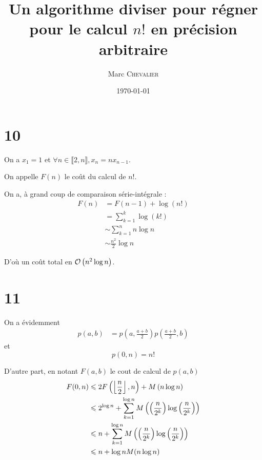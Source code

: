 

\title{Un algorithme diviser pour régner pour le calcul \texorpdfstring{$n!$}{n!} en précision arbitraire}
\author{
    Marc \textsc{Chevalier}
}
\date{\today}


\maketitle

\section*{10}

On a $x_1 = 1$ et $\forall n\in \llbracket 2,n\rrbracket, x_n = n x_{n-1}$.

On appelle $F(n)$ le coût du calcul de $n!$.

On a, à grand coup de comparaison série-intégrale :
\[
    \begin{aligned}
        F(n) &= F(n-1) + \log(n!)\\
        &= \sum\limits_{k=1}^k \log(k!)\\
        &\sim \sum\limits_{k=1}^n n \log n\\
        &\sim \frac{n^2}{2}\log n
    \end{aligned}
\]

D'où un coût total en $\mathcal O \left( n^2\log n \right)$.

\section*{11}

On a évidemment
\[
    \begin{aligned}
        p(a, b) &= p\left(a, \frac{a+b}{2}\right)p\left(\frac{a+b}{2}, b\right)
    \end{aligned}
\]
et
\[
    p(0,n) = n!
\]

D'autre part, en notant $F(a, b)$ le cout de calcul de $p(a, b)$
\[
    \begin{aligned}
        F(0,n) &\leqslant 2F\left(\left \lfloor \frac{n}{2} \right \rfloor, n\right) + M\left(n \log n\right)\\
        &\leqslant 2^{\log n} + \sum\limits_{k=1}^{\log n} M\left(\left(\frac{n}{2^k}\right)\log\left(\frac{n}{2^k}\right)\right)\\
        &\leqslant n + \sum\limits_{k=1}^{\log n} M\left(\left(\frac{n}{2^k}\right)\log\left(\frac{n}{2^k}\right)\right)\\
        &\leqslant n + \log nM(n \log n)
    \end{aligned}
\]

